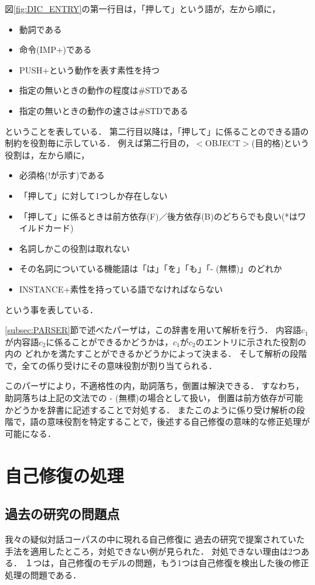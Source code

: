 図\ref{fig:DIC_ENTRY}の第一行目は，「押して」という語が，左から順に，
\begin{itemize}
\item 動詞である
\item 命令(IMP+)である
\item PUSH+という動作を表す素性を持つ
\item 指定の無いときの動作の程度は\#STDである
\item 指定の無いときの動作の速さは\#STDである
\end{itemize}
ということを表している．
第二行目以降は，「押して」に係ることのできる語の制約を役割毎に示している．
例えば第二行目の，$<$OBJECT$>$(目的格)という役割は，左から順に，
\begin{itemize}
\item 必須格(!が示す)である
\item 「押して」に対して1つしか存在しない
\item 「押して」に係るときは前方依存(F)／後方依存(B)のどちらでも良い(*はワイルドカード)
\item 名詞しかこの役割は取れない
\item その名詞についている機能語は「は」「を」「も」「- (無標)」のどれか
\item INSTANCE+素性を持っている語でなければならない
\end{itemize}
という事を表している．

\ref{subsec:PARSER}節で述べたパーザは，この辞書を用いて解析を行う．
内容語$c_1$が内容語$c_2$に係ることができるかどうかは，$c_1$が$c_2$のエントリに示された役割の内の
どれかを満たすことができるかどうかによって決まる．
そして解析の段階で，全ての係り受けにその意味役割が割り当てられる．

このパーザにより，不適格性の内，助詞落ち，倒置は解決できる．
すなわち，助詞落ちは上記の文法での - (無標)の場合として扱い，
倒置は前方依存が可能かどうかを辞書に記述することで対処する．
またこのように係り受け解析の段階で，語の意味役割を特定することで，後述する自己修復の意味的な修正処理が可能になる．

\section{自己修復の処理}\label{sec:SC}
\subsection{過去の研究の問題点}\label{subsec:PROBLEM}
我々の疑似対話コーパスの中に現れる自己修復に
過去の研究で提案されていた手法を適用したところ，対処できない例が見られた．
対処できない理由は2つある．
１つは，自己修復のモデルの問題，もう1つは自己修復を検出した後の修正処理の問題である．


